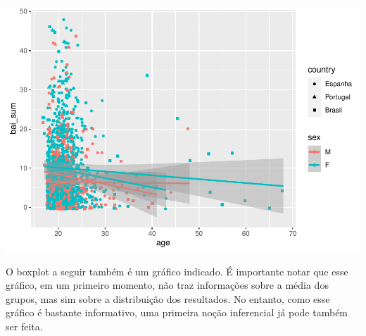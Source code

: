 \documentclass[
]{book}
\newenvironment{Shaded}{\begin{snugshade}}{\end{snugshade}}
\newcommand{\DataTypeTok}[1]{\textcolor[rgb]{0.13,0.29,0.53}{#1}}
\newcommand{\FloatTok}[1]{\textcolor[rgb]{0.00,0.00,0.81}{#1}}
\newcommand{\KeywordTok}[1]{\textcolor[rgb]{0.13,0.29,0.53}{\textbf{#1}}}
\newcommand{\NormalTok}[1]{#1}
\newcommand{\OperatorTok}[1]{\textcolor[rgb]{0.81,0.36,0.00}{\textbf{#1}}}
\newcommand{\StringTok}[1]{\textcolor[rgb]{0.31,0.60,0.02}{#1}}
\begin{document}
\begin{Shaded}
\end{Shaded}

\begin{center}\includegraphics{gitbook-demo_files/figure-latex/unnamed-chunk-27-1} \end{center}

O boxplot a seguir também é um gráfico indicado. É importante notar que esse gráfico, em um primeiro momento, não traz informações sobre a média dos grupos, mas sim sobre a distribuição dos resultados. No entanto, como esse gráfico é bastante informativo, uma primeira noção inferencial já pode também ser feita.

\begin{Shaded}
\end{Shaded}
\end{document}
